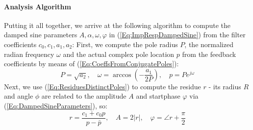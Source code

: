 \paragraph{Analysis Algorithm}
Putting it all together, we arrive at the following algorithm to compute the damped sine parameters $A, \alpha, \omega, \varphi$ in (\ref{Eq:ImpRespDampedSine}) from the filter coefficients $c_0, c_1, a_1, a_2$: First, we compute the pole radius $P$, the normalized radian frequency $\omega$ and the actual complex pole location $p$ from the feedback coefficients by means of (\ref{Eq:CoeffsFromConjugatePoles}):
\begin{equation}
\boxed
{
  P = \sqrt{a_2}, \quad \omega = \arccos \left( - \frac{a_1}{2P} \right), \quad p = P e^{j \omega}
}
\end{equation}
Next, we use (\ref{Eq:ResiduesDistinctPoles}) to compute the residue $r$ - its radius $R$ and angle $\phi$ are related to the amplitude $A$ and startphase $\varphi$ via (\ref{Eq:DampedSineParameters}), so:
\begin{equation}
\boxed
{
  r = \frac{c_1 + c_0 p}{p - \bar{p}}, \quad A = 2 |r|, \quad \varphi = \angle r + \frac{\pi}{2}
}
\end{equation}

